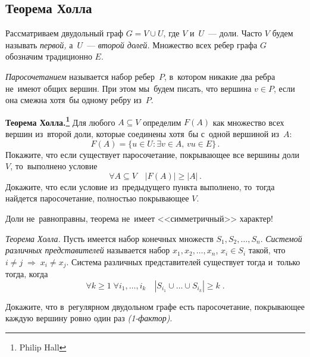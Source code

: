 \subsection*{Теорема Холла}

Рассматриваем двудольный граф $G = V \cup U$, где $V$ и~$U$~--- доли.
Часто $V$ будем называть \emph{первой,} а~$U$~--- \emph{второй долей.}
Множество всех ребер графа $G$ обозначим традиционно $E$.

\emph{Паросочетанием} называется набор ребер~$P$, в~котором никакие два ребра
не~имеют общих вершин.
При этом мы~будем писать, что вершина $v \in P$, если она смежна хотя~бы одному
ребру из~$P$.

\begin{problems}

\item\textbf{Теорема Холла.\footnote{Philip Hall}}
Для любого $A \subseteq V$ определим $F(A)$ как множество всех вершин из~второй
доли, которые соединены хотя~бы с~одной вершиной из~$A$:
\[
    F(A)
=
    \{
        u \in U
    \colon
        \exists v \in A
    ,\,
        vu \in E
    \}
\,.\]
\subproblem
Покажите, что если существует паросочетание, покрывающее все вершины доли~$V$,
то~выполнено условие
\[
    \forall A \subseteq V
\quad
    |F(A)| \geq |A|
\,.\]
\subproblem
Докажите, что если условие из~предыдущего пункта выполнено, то~тогда найдется
паросочетание, полностью покрывающее $V$.

\end{problems}

Доли не~равноправны, теорема не~имеет <<симметричный>> характер!

\begin{problems}

\item\emph{Теорема Холла.}
Пусть имеется набор конечных множеств $S_1, S_2, \ldots, S_n$.
\emph{Системой различных представителей} называется набор
$x_1, x_2, \ldots, x_n$, $x_i \in S_i$ такой, что
\(
    i \neq j
\;\Rightarrow\;
    x_i \neq x_j
\).
Система различных представителей существует тогда и~только тогда, когда
\[
    \forall k \geq 1
\;
    \forall i_1, \ldots, i_k
\quad
    |S_{i_1} \cup \ldots \cup S_{i_k}| \geq k
\;.\]

\item
Докажите, что в~регулярном двудольном графе есть паросочетание, покрывающее
каждую вершину ровно один раз \emph{(1-фактор)}.

\end{problems}

